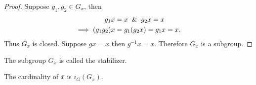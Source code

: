 \begin{proof}
  Suppose $g_1,g_2 \in G_x$, then
  \begin{align*}
    g_1 x &= x \And g_2 x = x\\
    \implies (g_1g_2)x &= g_1(g_2 x) = g_1 x = x.  
  \end{align*}
  Thus $G_x$ is closed. Suppose $gx=x$ then $g^{-1}x = x$. Therefore $G_x$ is a subgroup.
\end{proof}
\begin{definition}
  The subgroup $G_x$ is called the stabilizer.
\end{definition}
\begin{proposition}
  The cardinality of $\bar{x}$ is $i_{G}(G_x)$.
\end{proposition}
